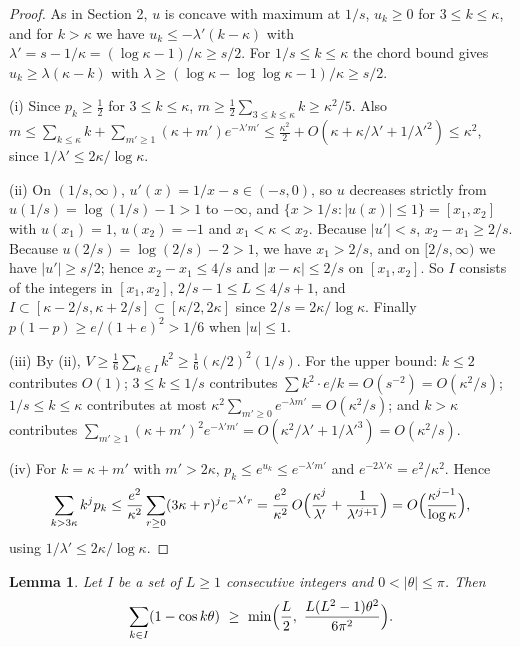 \documentclass[11pt,a4paper]{article}
\newtheorem{lemma}[theorem]{Lemma}
\theoremstyle{remark}
\begin{document}
\begin{proof}
As in Section 2, $u$ is concave with maximum at $1/s$, $u_k\ge0$ for $3\le k\le\kappa$, and for $k>\kappa$ we have $u_k\le-\lambda'(k-\kappa)$ with $\lambda'=s-1/\kappa=(\log\kappa-1)/\kappa\ge s/2$. For $1/s\le k\le\kappa$ the chord bound gives $u_k\ge\lambda(\kappa-k)$ with $\lambda\ge(\log\kappa-\log\log\kappa-1)/\kappa\ge s/2$.

(i) Since $p_k\ge\frac12$ for $3\le k\le\kappa$, $m\ge\frac12\sum_{3\le k\le\kappa}k\ge\kappa^2/5$. Also $m\le\sum_{k\le\kappa}k+\sum_{m'\ge1}(\kappa+m')e^{-\lambda'm'}\le\frac{\kappa^2}2+O(\kappa+\kappa/\lambda'+1/\lambda'^2)\le\kappa^2$, since $1/\lambda'\le2\kappa/\log\kappa$.

(ii) On $(1/s,\infty)$, $u'(x)=1/x-s\in(-s,0)$, so $u$ decreases strictly from $u(1/s)=\log(1/s)-1>1$ to $-\infty$, and $\{x>1/s:|u(x)|\le1\}=[x_1,x_2]$ with $u(x_1)=1$, $u(x_2)=-1$ and $x_1<\kappa<x_2$. Because $|u'|<s$, $x_2-x_1\ge2/s$. Because $u(2/s)=\log(2/s)-2>1$, we have $x_1>2/s$, and on $[2/s,\infty)$ we have $|u'|\ge s/2$; hence $x_2-x_1\le4/s$ and $|x-\kappa|\le2/s$ on $[x_1,x_2]$. So $I$ consists of the integers in $[x_1,x_2]$, $2/s-1\le L\le4/s+1$, and $I\subset[\kappa-2/s,\kappa+2/s]\subset[\kappa/2,2\kappa]$ since $2/s=2\kappa/\log\kappa$. Finally $p(1-p)\ge e/(1+e)^2>1/6$ when $|u|\le1$.

(iii) By (ii), $V\ge\frac16\sum_{k\in I}k^2\ge\frac16(\kappa/2)^2(1/s)$. For the upper bound: $k\le2$ contributes $O(1)$; $3\le k\le1/s$ contributes $\sum k^2\cdot e/k=O(s^{-2})=O(\kappa^2/s)$; $1/s\le k\le\kappa$ contributes at most $\kappa^2\sum_{m'\ge0}e^{-\lambda m'}=O(\kappa^2/s)$; and $k>\kappa$ contributes $\sum_{m'\ge1}(\kappa+m')^2e^{-\lambda'm'}=O(\kappa^2/\lambda'+1/\lambda'^3)=O(\kappa^2/s)$.

(iv) For $k=\kappa+m'$ with $m'>2\kappa$, $p_k\le e^{u_k}\le e^{-\lambda'm'}$ and $e^{-2\lambda'\kappa}=e^2/\kappa^2$. Hence
\[
 \sum_{k>3\kappa}k^jp_k\le\frac{e^2}{\kappa^2}\sum_{r\ge0}(3\kappa+r)^je^{-\lambda'r}=\frac{e^2}{\kappa^2}\,O\Bigl(\frac{\kappa^j}{\lambda'}+\frac{1}{\lambda'^{j+1}}\Bigr)=O\Bigl(\frac{\kappa^{j-1}}{\log\kappa}\Bigr),
\]
using $1/\lambda'\le2\kappa/\log\kappa$.
\end{proof}

\begin{lemma}\label{lem:fejer}
Let $I$ be a set of $L\ge1$ consecutive integers and $0<|\theta|\le\pi$. Then
\[
 \sum_{k\in I}(1-\cos k\theta)\ \ge\ \min\Bigl(\frac L2,\ \frac{L(L^2-1)\theta^2}{6\pi^2}\Bigr).
\]
\end{lemma}
\end{document}
